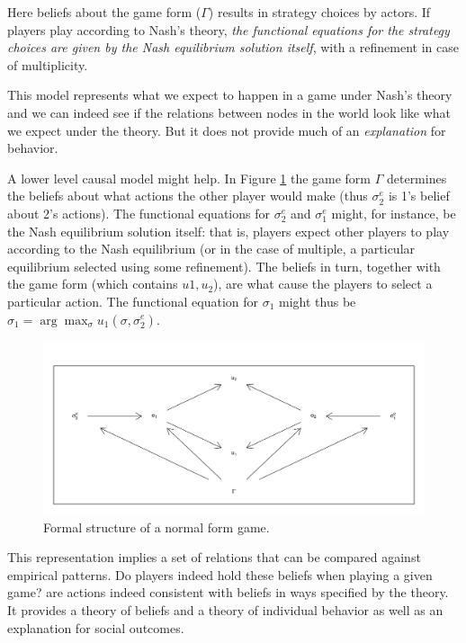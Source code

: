 \documentclass[
  12pt,
]{book}
\begin{document}
Here beliefs about the game form (\(\Gamma\)) results in strategy choices by actors. If players play according to Nash's theory, \emph{the functional equations for the strategy choices are given by the Nash equilibrium solution itself}, with a refinement in case of multiplicity.

This model represents what we expect to happen in a game under Nash's theory and we can indeed see if the relations between nodes in the world look like what we expect under the theory. But it does not provide much of an \emph{explanation} for behavior.

A lower level causal model might help. In Figure \ref{fig:nfg3}
the game form \(\Gamma\) determines the beliefs about what actions the other player would make (thus \(\sigma_2^e\) is 1's belief about 2's actions). The functional equations for \(\sigma_2^e\) and \(\sigma_1^e\) might, for instance, be the Nash equilibrium solution itself: that is, players expect other players to play according to the Nash equilibrium (or in the case of multiple, a particular equilibrium selected using some refinement). The beliefs in turn, together with the game form (which contains \(u1, u_2\)), are what cause the players to select a particular action. The functional equation for \(\sigma_1\) might thus be \(\sigma_1 = \arg \max_\sigma u_1(\sigma, \sigma_2^e)\).

\begin{figure}

{\centering \includegraphics[width=0.8\linewidth]{ii_files/figure-latex/nfg3-1} 

}

\caption{Formal structure of a normal form game.}\label{fig:nfg3}
\end{figure}

This representation implies a set of relations that can be compared against empirical patterns. Do players indeed hold these beliefs when playing a given game? are actions indeed consistent with beliefs in ways specified by the theory. It provides a theory of beliefs and a theory of individual behavior as well as an explanation for social outcomes.
\end{document}
